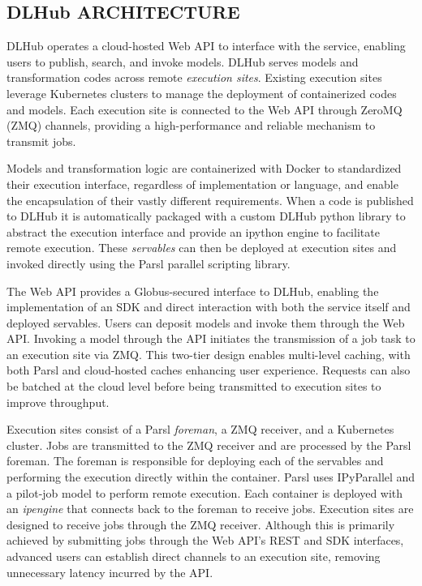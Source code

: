 \documentclass{aip-cp}
\begin{document}
\subsection{DLHub ARCHITECTURE}

DLHub operates a cloud-hosted Web API to interface with the 
service, enabling users to publish, search, and invoke models. DLHub serves models and 
transformation codes across remote \textit{execution 
sites}. Existing execution sites leverage Kubernetes clusters to manage the deployment of 
containerized codes and models. Each execution site is connected to the Web API 
through ZeroMQ (ZMQ) channels, providing a high-performance and reliable mechanism to transmit 
jobs. 

Models and transformation logic are containerized with Docker to standardized their execution 
interface, regardless of implementation or language, and enable the encapsulation of their vastly 
different requirements. When a code is published to DLHub it is automatically packaged with 
a custom DLHub python library to abstract the execution interface and provide an ipython engine to 
facilitate remote execution. These \textit{servables} can then be deployed at execution sites 
and invoked directly using the Parsl parallel scripting library.

The Web API provides a Globus-secured interface to DLHub, enabling the implementation 
of an SDK and direct interaction with both the service itself and deployed servables. Users can 
deposit models and invoke them through the Web API. Invoking a model through the API initiates the 
transmission of a job task to an execution site via ZMQ. This two-tier design enables multi-level 
caching, with both Parsl and cloud-hosted caches enhancing user experience. Requests can also be 
batched at the cloud level before being transmitted to execution sites to improve throughput.

Execution sites consist of a Parsl \textit{foreman}, a ZMQ receiver, and a Kubernetes cluster. Jobs 
are transmitted to the ZMQ receiver and are processed by the Parsl foreman. The foreman is 
responsible for deploying each of the servables and 
performing the execution directly within the container. Parsl uses IPyParallel and a pilot-job 
model to perform remote execution. Each container is deployed with an \textit{ipengine} that 
connects back to the foreman to receive jobs. Execution sites are designed to receive jobs through 
the ZMQ receiver. Although this is primarily achieved by submitting jobs through the Web API's REST 
and SDK interfaces, advanced users can establish direct channels to an execution site, removing 
unnecessary latency incurred by the API.
\end{document}
